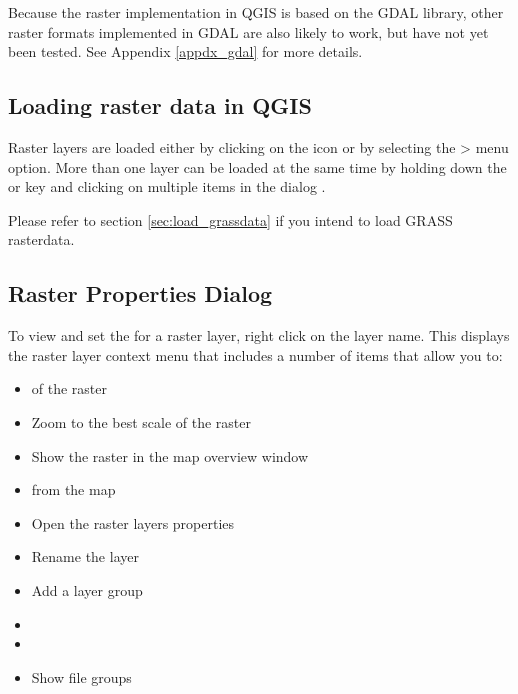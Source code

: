 Because the raster implementation in QGIS is based on the GDAL library, other
raster formats implemented in GDAL are also likely to work, but have not yet
been tested. See Appendix \ref{appdx_gdal} for more
details.
	
\subsection{Loading raster data in QGIS}\label{label_loadraster}

Raster layers are loaded either by clicking on the 
 icon or by
selecting the > menu option. More than one 
layer can be loaded at the same time by holding down the
 or  key
and clicking on multiple items in the dialog .

Please refer to section \ref{sec:load_grassdata} if you intend to load GRASS rasterdata.
	
\subsection{Raster Properties Dialog}\label{label_rasterprop}

To view and set the  for a raster layer, right click on the layer
name. This displays the raster layer context menu that includes a number of
items that allow you to:


\begin{itemize}
\item {} of the raster
\item Zoom to the best scale of the raster
\item Show the raster in the map overview window
\item {} from the map
\item Open the raster layers properties
\item Rename the layer
\item Add a layer group
\item {}
\item {}
\item Show file groups
\end{itemize}


